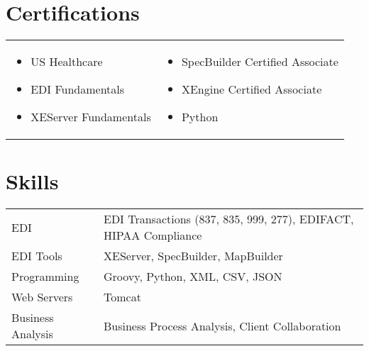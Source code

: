 \documentclass[a4paper,12pt]{article}
\begin{document}
\section{Certifications}
\begin{tabularx}{\linewidth}{@{}X X@{}}
\begin{itemize}[leftmargin=1em]
    \item US Healthcare
    \item EDI Fundamentals
    \item XEServer Fundamentals
\end{itemize} &
\begin{itemize}[leftmargin=1em]
    \item SpecBuilder Certified Associate
    \item XEngine Certified Associate
    \item Python
\end{itemize}
\end{tabularx}

\section{Skills}
\begin{tabularx}{\linewidth}{@{}l X@{}}
EDI & EDI Transactions (837, 835, 999, 277), EDIFACT, HIPAA Compliance \\
EDI Tools & XEServer, SpecBuilder, MapBuilder \\
Programming & Groovy, Python, XML, CSV, JSON \\
Web Servers & Tomcat \\
Business Analysis & Business Process Analysis, Client Collaboration \\
\end{tabularx}
\end{document}
